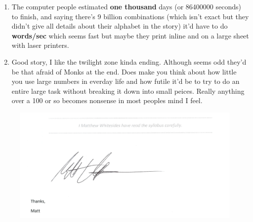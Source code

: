 \documentclass{article}
\begin{document}
\begin{enumerate}
\begin{enumerate}
    \item The computer people estimated \textbf{one thousand} days (or 86400000 seconds) to finish, and saying there's 9 billion combinations (which isn't exact but they didn't give all details about their alphabet in the story) it'd have to do  \textbf{words/sec} which seems fast but maybe they print inline and on a large sheet with laser printers. 
    \item Good story, I like the twilight zone kinda ending. Although seems odd they'd be that afraid of Monks at the end. Does make you think about how little you use large numbers in everday life and how futile it'd be to try to do an entire large task without breaking it down into small peices. Really anything over a 100 or so becomes nonsense in most peoples mind I feel.
  \end{enumerate}

\end{enumerate}

\pagebreak

\begin{figure}
  \includegraphics[width=\linewidth]{Statement.png}
  \label{fig:Statement}
\end{figure}
\end{document}
